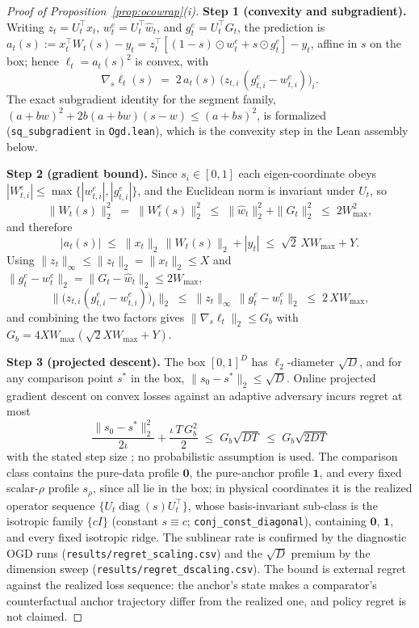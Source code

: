 \begin{proof}[Proof of Proposition~\ref{prop:ocowrap}(i)]
\textbf{Step 1 (convexity and subgradient).}
Writing $z_t = U_t^\top x_t$, $w^e_t = U_t^\top \widehat w_t$, and $g^e_t = U_t^\top G_t$, the prediction is $a_t(s) := x_t^\top W_t(s) - y_t = z_t^\top[(1-s)\odot w^e_t + s\odot g^e_t] - y_t$, affine in $s$ on the box; hence $\ell_t = a_t(s)^2$ is convex, with
\[
  \nabla_s \ell_t(s) \;=\; 2\,a_t(s)\,\bigl(z_{t,i}\,(g^e_{t,i} - w^e_{t,i})\bigr)_i .
\]
The exact subgradient identity for the segment family, $(a + b w)^2 + 2b(a + bw)(s - w) \le (a + b s)^2$, is formalized (\texttt{sq\_subgradient} in \texttt{Ogd.lean}), which is the convexity step in the Lean assembly below.

\textbf{Step 2 (gradient bound).}
Since $s_i \in [0,1]$ each eigen-coordinate obeys $|W^e_{t,i}| \le \max\{|w^e_{t,i}|, |g^e_{t,i}|\}$, and the Euclidean norm is invariant under $U_t$, so
\[
  \|W_t(s)\|_2^2 \;=\; \|W^e_t(s)\|_2^2 \;\le\; \|\widehat w_t\|_2^2 + \|G_t\|_2^2 \;\le\; 2W_{\max}^2,
\]
and therefore
\[
  |a_t(s)| \;\le\; \|x_t\|_2\, \|W_t(s)\|_2 + |y_t| \;\le\; \sqrt 2\, X W_{\max} + Y .
\]
Using $\|z_t\|_\infty \le \|z_t\|_2 = \|x_t\|_2 \le X$ and $\|g^e_t - w^e_t\|_2 = \|G_t - \widehat w_t\|_2 \le 2W_{\max}$,
\[
  \bigl\|\bigl(z_{t,i}(g^e_{t,i} - w^e_{t,i})\bigr)_i\bigr\|_2
  \;\le\; \|z_t\|_\infty\, \|g^e_t - w^e_t\|_2
  \;\le\; 2\,X W_{\max},
\]
and combining the two factors gives $\|\nabla_s \ell_t\|_2 \le G_b$ with $G_b = 4XW_{\max}(\sqrt 2 XW_{\max} + Y)$.

\textbf{Step 3 (projected descent).}
The box $[0,1]^D$ has $\ell_2$-diameter $\sqrt D$, and for any comparison point $s^*$ in the box, $\|s_0 - s^*\|_2 \le \sqrt D$.
Online projected gradient descent on convex losses against an adaptive adversary incurs regret at most
\[
  \frac{\|s_0 - s^*\|_2^2}{2\iota} + \frac{\iota\, T\, G_b^2}{2}
  \;\le\; G_b\sqrt{DT}
  \;\le\; G_b\sqrt{2DT}
\]
with the stated step size \citep{zinkevich2003}; no probabilistic assumption is used.
The comparison class contains the pure-data profile $\mathbf 0$, the pure-anchor profile $\mathbf 1$, and every fixed scalar-$\rho$ profile $s_\rho$, since all lie in the box; in physical coordinates it is the realized operator sequence $\{U_t\operatorname{diag}(s)U_t^\top\}$, whose basis-invariant sub-class is the isotropic family $\{cI\}$ (constant $s \equiv c$; \texttt{conj\_const\_diagonal}), containing $\mathbf 0$, $\mathbf 1$, and every fixed isotropic ridge. The sublinear rate is confirmed by the diagnostic OGD runs (\texttt{results/regret\_scaling.csv}) and the $\sqrt D$ premium by the dimension sweep (\texttt{results/regret\_dscaling.csv}).
The bound is external regret against the realized loss sequence: the anchor's state makes a comparator's counterfactual anchor trajectory differ from the realized one, and policy regret is not claimed.
\end{proof}

